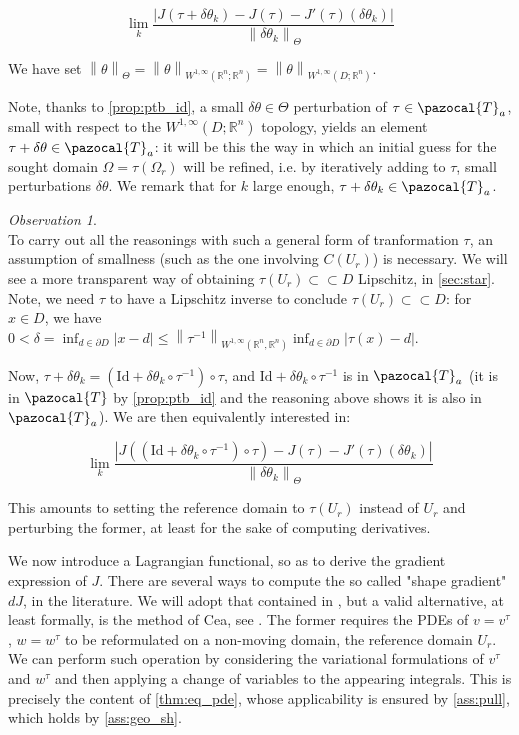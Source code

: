 \documentclass[english,a4paper,9pt,oneside]{scrbook}	%
\theoremstyle{break}
\theoremstyle{remark}
\newtheorem{obs}[equation]{Observation}
\newcommand{\mR}{\mathbb{R}}
\newcommand{\norm}[1]{\left\lVert#1\right\rVert}
\newcommand{\cc}{\subset\subset}
\newcommand{\cT}{\pazocal{T}}
\newcommand{\id}{\text{Id}}
\newcommand{\te}{\theta}
\newcommand{\Te}{\Theta}
\begin{document}
$$\lim_{k}\frac{|J(\tau+\delta \te_k)-J(\tau)-J'(\tau)(\delta \te_k)|}{\norm{\delta \te_k}_{\Te}}$$

We have set $\norm{\te}_\Te = \norm{\te}_{W^{1,\infty}(\mR^n;\mR^n)}=\norm{\te}_{W^{1,\infty}(D;\mR^n)}$.

Note, thanks to \cref{prop:ptb_id}, a small $\delta \te \in \Te$ perturbation of $\tau \in \cT_a$, small with respect to the $W^{1,\infty}(D;\mR^n)$ topology, yields an element $\tau +\delta  \te \in \cT_a$: it will be this the way in which an initial guess for the sought domain $\Omega = \tau(\Omega_r)$ will be refined, i.e. by iteratively adding to $\tau$, small perturbations $\delta \te$. We remark that for $k$ large enough, $\tau+\delta \te_k \in \cT_a$.

\begin{obs}
\mbox{}\\
To carry out all the reasonings with such a general form of tranformation $\tau$, an assumption of smallness (such as the one involving $C(U_r)$) is necessary. We will see a more transparent way of obtaining $\tau(U_r)\cc D$ Lipschitz, in \cref{sec:star}.
\mbox{}\\
Note, we need $\tau$ to have a Lipschitz inverse to conclude $\tau(U_r)\cc D$: for $x \in D$, we have $0<\delta = \inf_{d \in \partial D}|x-d|\leq \norm{\tau^{-1}}_{W^{1,\infty}(\mR^n,\mR^n)}\inf_{d \in \partial D}|\tau(x)-d|$.
\end{obs}


Now, $\tau+\delta \te_k  = (\id+\delta\te_k \circ \tau^{-1})\circ \tau$, and $\id+\delta\te_k \circ \tau^{-1}$ is in $\cT_a$ (it is in $\cT$ by \cref{prop:ptb_id} and the reasoning above shows it is also in $\cT_a$). We are then equivalently interested in:

$$\lim_{k}\frac{|J((\id+\delta\te_k \circ \tau^{-1})\circ \tau)-J(\tau)-J'(\tau)(\delta \te_k)|}{\norm{\delta \te_k}_{\Te}}$$

This amounts to setting the reference domain to $\tau(U_r)$ instead of $U_r$ and perturbing the former, at least for the sake of computing derivatives.

We now introduce a Lagrangian functional, so as to derive the gradient expression of $J$. There are several ways to compute the so called "shape gradient" $dJ$, in the literature. We will adopt that contained in \cite{avg_adj}, but a valid alternative, at least formally, is the method of Cea, see \cite{cea}. The former requires the PDEs of $v=v^\tau$, $w=w^\tau$ to be reformulated on a non-moving domain, the reference domain $U_r$. We can perform such operation by considering the variational formulations of $v^\tau$ and $w^\tau$ and then applying a change of variables to the appearing integrals. This is precisely the content of \cref{thm:eq_pde}, whose applicability is ensured by \cref{ass:pull}, which holds by \cref{ass:geo_sh}.
\end{document}
